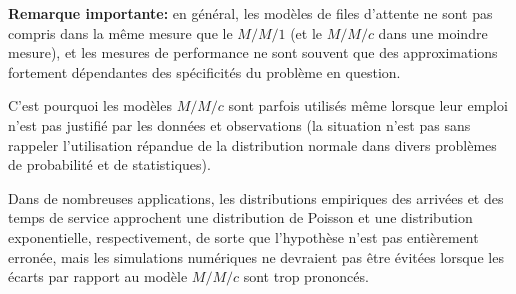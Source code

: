 \noindent \textbf{Remarque importante:} en général, les modèles de files d'attente ne sont pas compris dans la même mesure que le $M/M/1$ (et le $M/M/c$ dans une moindre mesure), et les mesures de performance ne sont souvent que des approximations fortement dépendantes des spécificités du problème en question. \par C'est pourquoi les modèles $M/M/c$ sont parfois utilisés même lorsque leur emploi n'est pas justifié par les données et observations (la situation n'est pas sans rappeler l'utilisation répandue de la distribution normale dans divers problèmes de probabilité et de statistiques). \par Dans de nombreuses applications, les distributions empiriques des arrivées et des temps de service approchent une distribution de Poisson et une distribution exponentielle, respectivement, de sorte que l'hypothèse n'est pas entièrement erronée, mais les simulations numériques ne devraient pas être évitées lorsque les écarts par rapport au modèle $M/M/c$ sont trop prononcés.